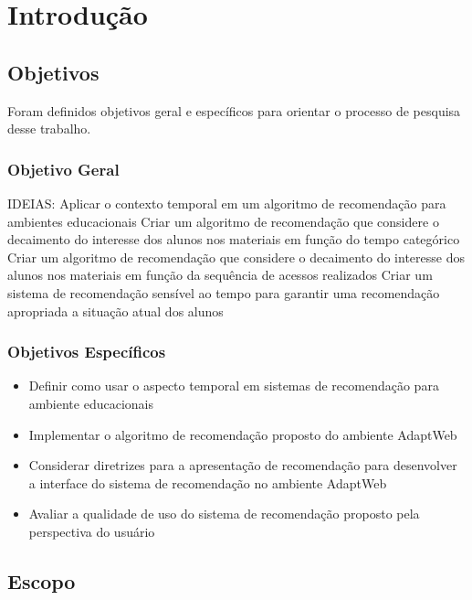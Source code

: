 \chapter{Introdução}\label{introducao}

\section{Objetivos}

Foram definidos objetivos geral e específicos para orientar o processo de pesquisa desse trabalho.

\subsection{Objetivo Geral}

IDEIAS:
Aplicar o contexto temporal em um algoritmo de recomendação para ambientes educacionais
Criar um algoritmo de recomendação que considere o decaimento do interesse dos alunos nos materiais em função do
tempo categórico
Criar um algoritmo de recomendação que considere o decaimento do interesse dos alunos nos materiais em função da
sequência de acessos realizados
Criar um sistema de recomendação sensível ao tempo para garantir uma recomendação apropriada a situação atual dos alunos

\subsection{Objetivos Específicos}

\begin{itemize}
\item Definir como usar o aspecto temporal em sistemas de recomendação para ambiente educacionais
\item Implementar o algoritmo de recomendação proposto do ambiente AdaptWeb\textsuperscript{\textregistered}
\item Considerar diretrizes para a apresentação de recomendação para desenvolver a interface do sistema de recomendação
no ambiente AdaptWeb\textsuperscript{\textregistered}
\item Avaliar a qualidade de uso do sistema de recomendação proposto pela perspectiva do usuário
\end{itemize}

\section{Escopo}

